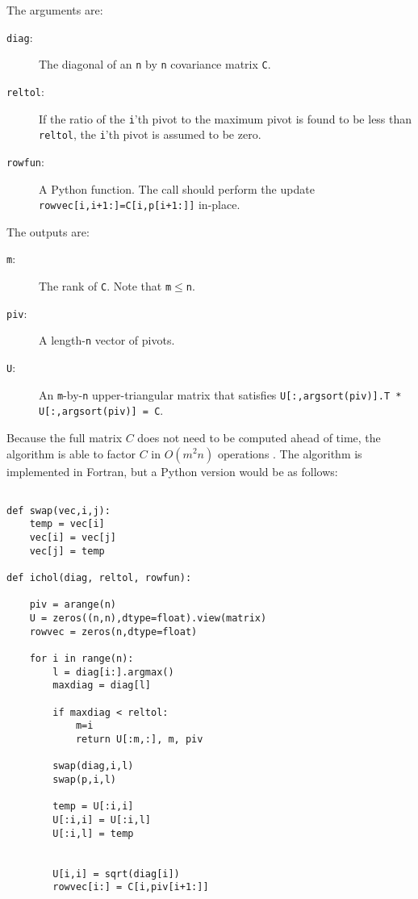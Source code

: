 \documentclass{manual}
\begin{document}
\begin{description}
The arguments are:
    \begin{description}
        \item[\texttt{diag}:] The diagonal of an \texttt{n} by \texttt{n} covariance matrix \texttt{C}.
        \item[\texttt{reltol}:] If the ratio of the \texttt{i}'th pivot to the maximum pivot is found to be less than \texttt{reltol}, the \texttt{i}'th pivot is assumed to be zero.
        \item[\texttt{rowfun}:] A Python function. The call  should perform the update \texttt{rowvec[i,i+1:]=C[i,p[i+1:]]} in-place.
    \end{description}

The outputs are:
    \begin{description}
        \item[\texttt{m}:] The rank of \texttt{C}. Note that \texttt{m}$\le$\texttt{n}.
        \item[\texttt{piv}:] A length-\texttt{n} vector of pivots.
        \item[\texttt{U}:] An \texttt{m}-by-\texttt{n} upper-triangular matrix that satisfies \texttt{U[:,argsort(piv)].T * U[:,argsort(piv)] = C}.
    \end{description}

Because the full matrix $C$ does not need to be computed ahead of time, the algorithm is able to factor $C$ in $O(m^2 n)$ operations \cite{incompchol}. The algorithm is implemented in Fortran, but a Python version would be as follows:

\begin{verbatim}

def swap(vec,i,j):
    temp = vec[i]
    vec[i] = vec[j]
    vec[j] = temp

def ichol(diag, reltol, rowfun):

    piv = arange(n)
    U = zeros((n,n),dtype=float).view(matrix)
    rowvec = zeros(n,dtype=float)

    for i in range(n):
        l = diag[i:].argmax()
        maxdiag = diag[l]
    
        if maxdiag < reltol:
            m=i
            return U[:m,:], m, piv

        swap(diag,i,l)
        swap(p,i,l)
    
        temp = U[:i,i]
        U[:i,i] = U[:i,l]
        U[:i,l] = temp
    

        U[i,i] = sqrt(diag[i])
        rowvec[i:] = C[i,piv[i+1:]]
    

\end{verbatim}
\end{description}
\end{document}
